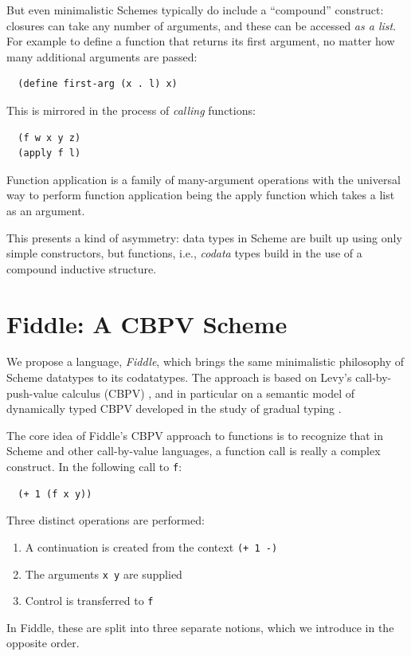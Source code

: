 \documentclass[acmsmall,screen,review,anonymous]{acmart}
\begin{document}
But even minimalistic Schemes typically do include a ``compound''
construct: closures can take any number of arguments, and these can be
accessed \emph{as a list}. For example to define a function that
returns its first argument, no matter how many additional arguments
are passed:
\begin{verbatim}
  (define first-arg (x . l) x)
\end{verbatim}

This is mirrored in the process of \emph{calling} functions:
\begin{verbatim}
  (f w x y z)
  (apply f l)
\end{verbatim}
Function application is a family of many-argument operations with the
universal way to perform function application being the apply function
which takes a list as an argument.

This presents a kind of asymmetry: data types in Scheme are built up
using only simple constructors, but functions, i.e.,
\emph{codata} types build in the use of a compound inductive structure.

\section{Fiddle: A CBPV Scheme}

We propose a language, \emph{Fiddle}, which brings the same
minimalistic philosophy of Scheme datatypes to its codatatypes. The
approach is based on Levy's call-by-push-value calculus (CBPV)
\cite{cbpv}, and in particular on a semantic model of dynamically
typed CBPV developed in the study of gradual typing
\cite{gradual-cbpv}.

The core idea of Fiddle's CBPV approach to functions is to recognize
that in Scheme and other call-by-value languages, a function call is really a complex construct. In the following call to \texttt{f}:
\begin{verbatim}
  (+ 1 (f x y))
\end{verbatim}
Three distinct operations are performed:
\begin{enumerate}
\item A continuation is created from the context \texttt{(+ 1 -)}
\item The arguments \texttt{x y} are supplied
\item Control is transferred to \texttt{f}
\end{enumerate}
In Fiddle, these are split into three separate notions, which we
introduce in the opposite order.
\end{document}

